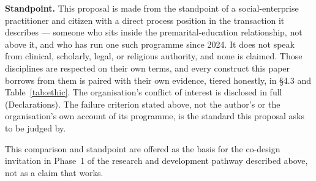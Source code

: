 \textbf{Standpoint.} This proposal is made from the standpoint of a social-enterprise practitioner
and citizen with a direct process position in the transaction it describes --- someone who sits
inside the premarital-education relationship, not above it, and who has run one such programme since
2024. It does not speak from clinical, scholarly, legal, or religious authority, and none is
claimed. Those disciplines are respected on their own terms, and every construct this paper borrows
from them is paired with their own evidence, tiered honestly, in \S4.3 and Table~\ref{tab:ethic}. The
organisation's conflict of interest is disclosed in full (Declarations). The failure criterion stated
above, not the author's or the organisation's own account of its programme, is the standard this
proposal asks to be judged by.

This comparison and standpoint are offered as the basis for the co-design invitation in Phase~1 of
the research and development pathway described above, not as a claim that \tphe{} works.
